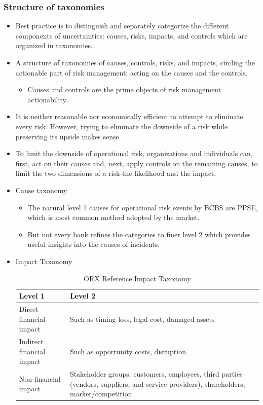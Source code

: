 \subsubsection{Structure of taxonomies}
\begin{itemize}

\item Best practice is to distinguish and separately categorize the different components of uncertainties: causes, risks, impacts, and controls which are organized in taxonomies.
\item A structure of taxonomies of causes, controls, risks, and impacts, circling the actionable part of risk management: acting on the causes and the controls.
    \begin{itemize}
    \item Causes and controls are the prime objects of risk
    management actionability.
    \end{itemize}
\item It is neither reasonable nor economically efficient to attempt to eliminate every risk. However, trying to eliminate the downside of a risk while preserving its upside makes sense.
\item  To limit the downside of operational risk, organizations and individuals can, first, act on their causes and, next, apply controls on the remaining causes, to limit the two dimensions of a risk-the likelihood and the impact.
\item Cause taxonomy
    \begin{itemize}
    \item The natural level 1 causes for operational risk events by BCBS are PPSE, which is most common method adopted by the market.
    \item  But not every bank refines the categories to finer level 2 which provides useful insights into the causes of incidents.
    \end{itemize}
\item Impact Taxonomy
\begin{table}[h]
    \centering
    \caption{ORX Reference Impact Taxonomy}
    \begin{tabular}{@{}>{\raggedright}p{4cm}p{12cm}@{}}
        \toprule
        \textbf{Level 1} & \textbf{Level 2} \\ \midrule
        Direct financial impact & Such as timing loss, legal cost, damaged assets \\ \midrule
        Indirect financial impact & Such as opportunity costs, disruption \\ \midrule
        Non-financial impact & Stakeholder groups: customers, employees, third parties (vendors, suppliers, and service providers), shareholders, market/competition \\ \bottomrule
    \end{tabular}
\end{table}


\end{itemize}
